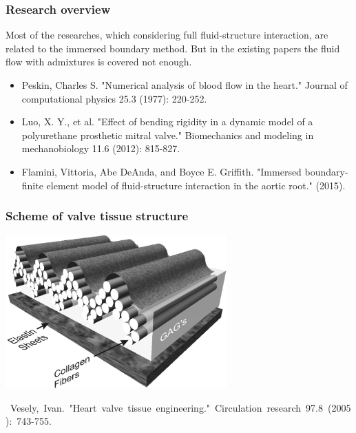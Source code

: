 \documentclass[14pt]{beamer}
\begin{document}
\begin{frame}
\frametitle{Research overview}
    Most of the researches, which considering full fluid-structure interaction,
    are related to the immersed boundary method. But in the existing papers the fluid flow
    with admixtures is covered not enough.
    \par
    {\tiny
        \begin{itemize}
            \item[\MVRightarrow] Peskin, Charles S. "Numerical analysis of blood flow in the heart." Journal of computational physics 25.3 (1977): 220-252.
            \item[\MVRightarrow] Luo, X. Y., et al. "Effect of bending rigidity in a dynamic model of a polyurethane prosthetic mitral valve." Biomechanics and modeling in mechanobiology 11.6 (2012): 815-827.
            \item[\MVRightarrow] Flamini, Vittoria, Abe DeAnda, and Boyce E. Griffith. "Immersed boundary-finite element model of fluid-structure interaction in the aortic root." (2015).
        \end{itemize}
    }
\end{frame}

\begin{frame}
\frametitle{Scheme of valve tissue structure}
    \begin{center}
        \includegraphics[width=8.5cm]{valve_tissue_structure.jpg}
    \end{center}

    \begin{spacing}{0.5}
        \mbox{\scriptsize
            Vesely, Ivan. "Heart valve tissue engineering." Circulation research 97.8 (2005): 743-755.
        }
    \end{spacing}

\end{frame}
\end{document}

